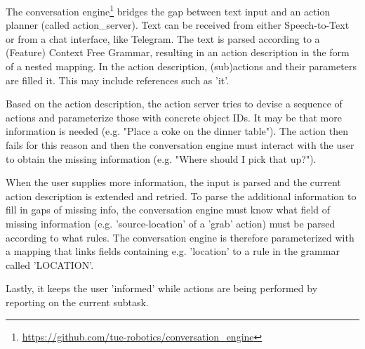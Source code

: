 The conversation engine\footnote{\url{https://github.com/tue-robotics/conversation_engine}} bridges the gap between text input and an action planner (called action\_server). Text can be received from either Speech-to-Text or from a chat interface, like Telegram\texttrademark\hspace{0em}.
The text is parsed according to a (Feature) Context Free Grammar, resulting in an action description in the form of a nested mapping. In the action description, (sub)actions and their parameters are filled it. This may include references such as 'it'.

Based on the action description, the action server tries to devise a sequence of actions and parameterize those with concrete object IDs. It may be that more information is needed (e.g. "Place a coke on the dinner table"). The action then fails for this reason and then the conversation engine must interact with the user to obtain the missing information (e.g. "Where should I pick that up?").

When the user supplies more information, the input is parsed and the current action description is extended and retried. To parse the additional information to fill in gaps of missing info, the conversation engine must know what field of missing information (e.g. 'source-location' of a 'grab' action) must be parsed according to what rules. The conversation engine is therefore parameterized with a mapping that links fields containing e.g. 'location' to a rule in the grammar called 'LOCATION'.

Lastly, it keeps the user 'informed' while actions are being performed by reporting on the current subtask.
